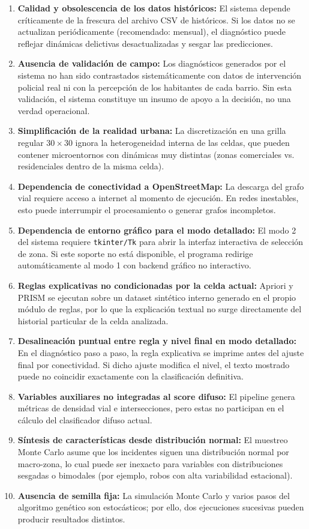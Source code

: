 \documentclass[11pt]{article}
\begin{document}
\begin{enumerate}
    \item \textbf{Calidad y obsolescencia de los datos históricos:} El sistema depende críticamente de la frescura del archivo CSV de históricos. Si los datos no se actualizan periódicamente (recomendado: mensual), el diagnóstico puede reflejar dinámicas delictivas desactualizadas y sesgar las predicciones.
    \item \textbf{Ausencia de validación de campo:} Los diagnósticos generados por el sistema no han sido contrastados sistemáticamente con datos de intervención policial real ni con la percepción de los habitantes de cada barrio. Sin esta validación, el sistema constituye un insumo de apoyo a la decisión, no una verdad operacional.
    \item \textbf{Simplificación de la realidad urbana:} La discretización en una grilla regular $30 \times 30$ ignora la heterogeneidad interna de las celdas, que pueden contener microentornos con dinámicas muy distintas (zonas comerciales vs. residenciales dentro de la misma celda).
    \item \textbf{Dependencia de conectividad a OpenStreetMap:} La descarga del grafo vial requiere acceso a internet al momento de ejecución. En redes inestables, esto puede interrumpir el procesamiento o generar grafos incompletos.
    \item \textbf{Dependencia de entorno gráfico para el modo detallado:} El modo 2 del sistema requiere \texttt{tkinter/Tk} para abrir la interfaz interactiva de selección de zona. Si este soporte no está disponible, el programa redirige automáticamente al modo 1 con backend gráfico no interactivo.
    \item \textbf{Reglas explicativas no condicionadas por la celda actual:} Apriori y PRISM se ejecutan sobre un dataset sintético interno generado en el propio módulo de reglas, por lo que la explicación textual no surge directamente del historial particular de la celda analizada.
    \item \textbf{Desalineación puntual entre regla y nivel final en modo detallado:} En el diagnóstico paso a paso, la regla explicativa se imprime antes del ajuste final por conectividad. Si dicho ajuste modifica el nivel, el texto mostrado puede no coincidir exactamente con la clasificación definitiva.
    \item \textbf{Variables auxiliares no integradas al score difuso:} El pipeline genera métricas de densidad vial e intersecciones, pero estas no participan en el cálculo del clasificador difuso actual.
    \item \textbf{Síntesis de características desde distribución normal:} El muestreo Monte Carlo asume que los incidentes siguen una distribución normal por macro-zona, lo cual puede ser inexacto para variables con distribuciones sesgadas o bimodales (por ejemplo, robos con alta variabilidad estacional).
    \item \textbf{Ausencia de semilla fija:} La simulación Monte Carlo y varios pasos del algoritmo genético son estocásticos; por ello, dos ejecuciones sucesivas pueden producir resultados distintos.
\end{enumerate}
\end{document}
